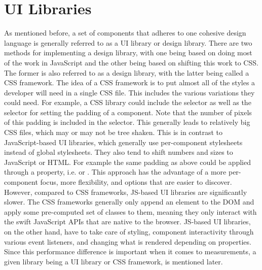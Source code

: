 \section{UI Libraries}\label{sec:bg:ui-libraries}
As mentioned before, a set of components that adheres to one cohesive design language is generally referred to as a UI library or design library. There are two methods for implementing a design library, with one being based on doing most of the work in JavaScript and the other being based on shifting this work to CSS. The former is also referred to as a design library, with the latter being called a CSS framework. The idea of a CSS framework is to put almost all of the styles a developer will need in a single CSS file. This includes the various variations they could need. For example, a CSS library could include the  selector as well as the  selector for setting the padding of a component. Note that the number of pixels of this padding is included in the selector. This generally leads to relatively big CSS files, which may or may not be tree shaken. This is in contrast to JavaScript-based UI libraries, which generally use per-component stylesheets instead of global stylesheets. They also tend to shift numbers and sizes to JavaScript or HTML\@. For example the same padding as above could be applied through a property, i.e.  or . This approach has the advantage of a more per-component focus, more flexibility, and options that are easier to discover. However, compared to CSS frameworks, JS-based UI libraries are significantly slower. The CSS frameworks generally only append an element to the DOM and apply some pre-computed set of classes to them, meaning they only interact with the swift JavaScript APIs that are native to the browser. JS-based UI libraries, on the other hand, have to take care of styling, component interactivity through various event listeners, and changing what is rendered depending on properties. Since this performance difference is important when it comes to measurements, a given library being a UI library or CSS framework, is mentioned later.
